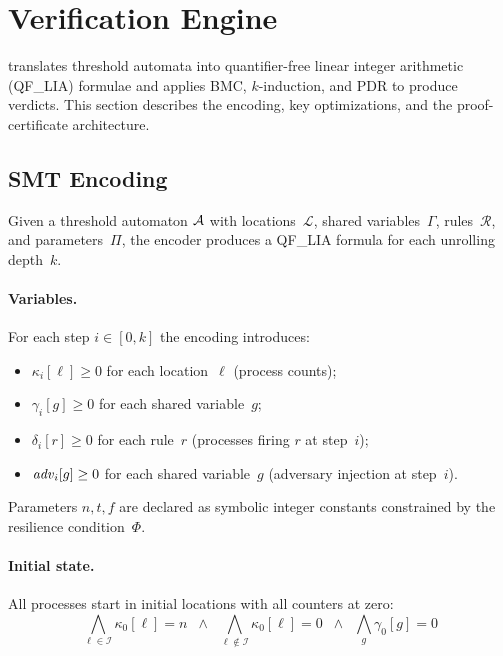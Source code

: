\section{Verification Engine}\label{sec:verification}

\tarsier{} translates threshold automata into quantifier-free linear
integer arithmetic (QF\_LIA) formulae and applies BMC, $k$-induction,
and PDR to produce verdicts.  This section describes the encoding,
key optimizations, and the proof-certificate architecture.

\subsection{SMT Encoding}

Given a threshold automaton $\mathcal{A}$ with locations~$\mathcal{L}$, shared
variables~$\Gamma$, rules~$\mathcal{R}$, and parameters~$\Pi$, the
encoder produces a QF\_LIA formula for each unrolling depth~$k$.

\paragraph{Variables.}
For each step $i \in [0, k]$ the encoding introduces:
\begin{itemize}
  \item $\kappa_i[\ell] \geq 0$ for each location~$\ell$
    (process counts);
  \item $\gamma_i[g] \geq 0$ for each shared variable~$g$;
  \item $\delta_i[r] \geq 0$ for each rule~$r$
    (processes firing $r$ at step~$i$);
  \item $\mathit{adv}_i[g] \geq 0$ for each shared variable~$g$
    (adversary injection at step~$i$).
\end{itemize}
Parameters $n, t, f$ are declared as symbolic integer constants
constrained by the resilience condition~$\Phi$.

\paragraph{Initial state.}
All processes start in initial locations with all counters at zero:
\begin{equation}
  \bigwedge_{\ell \in \mathcal{I}} \kappa_0[\ell] = n
  \;\;\wedge\;\;
  \bigwedge_{\ell \notin \mathcal{I}} \kappa_0[\ell] = 0
  \;\;\wedge\;\;
  \bigwedge_{g} \gamma_0[g] = 0
\end{equation}

